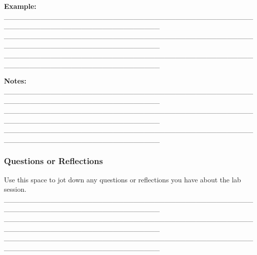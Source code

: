 \documentclass[
  11pt,
]{article}
\begin{document}
\textbf{Example:}
\_\_\_\_\_\_\_\_\_\_\_\_\_\_\_\_\_\_\_\_\_\_\_\_\_\_\_\_\_\_\_\_\_\_\_\_\_\_\_\_\_\_\_\_\_\_\_\_\_\_\_\_\_\_\_\_\_\_\_\_\_\_\_\_\_\_\_\_\_\_\_\_\_\_\_\_\_\_
\_\_\_\_\_\_\_\_\_\_\_\_\_\_\_\_\_\_\_\_\_\_\_\_\_\_\_\_\_\_\_\_\_\_\_\_\_\_\_\_\_\_\_\_\_\_\_\_\_\_\_\_\_\_\_\_\_\_\_\_\_\_\_\_\_\_\_\_\_\_\_\_\_\_\_\_\_\_
\_\_\_\_\_\_\_\_\_\_\_\_\_\_\_\_\_\_\_\_\_\_\_\_\_\_\_\_\_\_\_\_\_\_\_\_\_\_\_\_\_\_\_\_\_\_\_\_\_\_\_\_\_\_\_\_\_\_\_\_\_\_\_\_\_\_\_\_\_\_\_\_\_\_\_\_\_\_

\textbf{Notes:}
\_\_\_\_\_\_\_\_\_\_\_\_\_\_\_\_\_\_\_\_\_\_\_\_\_\_\_\_\_\_\_\_\_\_\_\_\_\_\_\_\_\_\_\_\_\_\_\_\_\_\_\_\_\_\_\_\_\_\_\_\_\_\_\_\_\_\_\_\_\_\_\_\_\_\_\_\_\_
\_\_\_\_\_\_\_\_\_\_\_\_\_\_\_\_\_\_\_\_\_\_\_\_\_\_\_\_\_\_\_\_\_\_\_\_\_\_\_\_\_\_\_\_\_\_\_\_\_\_\_\_\_\_\_\_\_\_\_\_\_\_\_\_\_\_\_\_\_\_\_\_\_\_\_\_\_\_
\_\_\_\_\_\_\_\_\_\_\_\_\_\_\_\_\_\_\_\_\_\_\_\_\_\_\_\_\_\_\_\_\_\_\_\_\_\_\_\_\_\_\_\_\_\_\_\_\_\_\_\_\_\_\_\_\_\_\_\_\_\_\_\_\_\_\_\_\_\_\_\_\_\_\_\_\_\_

\subsubsection{Questions or Reflections}\label{questions-or-reflections}

Use this space to jot down any questions or reflections you have about
the lab session.
\_\_\_\_\_\_\_\_\_\_\_\_\_\_\_\_\_\_\_\_\_\_\_\_\_\_\_\_\_\_\_\_\_\_\_\_\_\_\_\_\_\_\_\_\_\_\_\_\_\_\_\_\_\_\_\_\_\_\_\_\_\_\_\_\_\_\_\_\_\_\_\_\_\_\_\_\_\_
\_\_\_\_\_\_\_\_\_\_\_\_\_\_\_\_\_\_\_\_\_\_\_\_\_\_\_\_\_\_\_\_\_\_\_\_\_\_\_\_\_\_\_\_\_\_\_\_\_\_\_\_\_\_\_\_\_\_\_\_\_\_\_\_\_\_\_\_\_\_\_\_\_\_\_\_\_\_
\_\_\_\_\_\_\_\_\_\_\_\_\_\_\_\_\_\_\_\_\_\_\_\_\_\_\_\_\_\_\_\_\_\_\_\_\_\_\_\_\_\_\_\_\_\_\_\_\_\_\_\_\_\_\_\_\_\_\_\_\_\_\_\_\_\_\_\_\_\_\_\_\_\_\_\_\_\_
\end{document}
